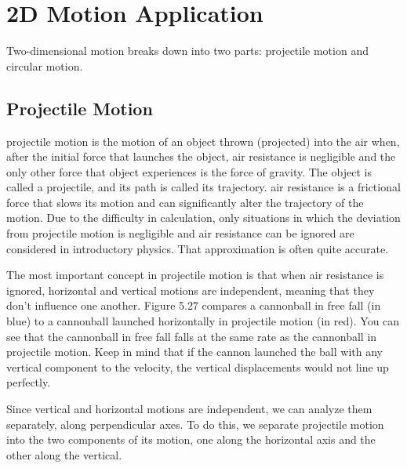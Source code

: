 \documentclass[main.tex]{subfiles}
\begin{document}
\section{2D Motion Application}

Two-dimensional motion breaks down into two parts: projectile motion and circular motion.

\subsection{Projectile Motion} \label{tMF7JY}

\Gls{projectile motion} is the motion of an object thrown (projected) into the air when, after the initial force that launches the object, air resistance is negligible and the only other force that object experiences is the force of gravity. The object is called a \gls{projectile}, and its path is called its \gls{trajectory}. \Gls{air resistance} is a frictional force that slows its motion and can significantly alter the trajectory of the motion. Due to the difficulty in calculation, only situations in which the deviation from projectile motion is negligible and air resistance can be ignored are considered in introductory physics. That approximation is often quite accurate.

\vspace{1em}

The most important concept in projectile motion is that when air resistance is ignored, horizontal and vertical motions are independent, meaning that they don't influence one another. Figure 5.27 compares a cannonball in free fall (in blue) to a cannonball launched horizontally in projectile motion (in red). You can see that the cannonball in free fall falls at the same rate as the cannonball in projectile motion. Keep in mind that if the cannon launched the ball with any vertical component to the velocity, the vertical displacements would not line up perfectly.

\vspace{1em}

Since vertical and horizontal motions are independent, we can analyze them separately, along perpendicular axes. To do this, we separate projectile motion into the two components of its motion, one along the horizontal axis and the other along the vertical.
\end{document}
